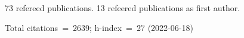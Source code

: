 73 refereed publications. 13 refeered publications as first author.

Total citations~=~2639; h-index~=~27 (2022-06-18)